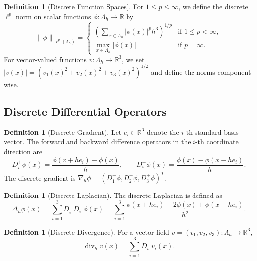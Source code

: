 \documentclass[12pt, a4paper]{article}
\theoremstyle{plain}
\theoremstyle{definition}
\newtheorem{definition}[theorem]{Definition}
\theoremstyle{remark}
\newcommand{\R}{\mathbb{R}}
\newcommand{\norm}[1]{\left\| #1 \right\|}
\newcommand{\grad}{\nabla_h}
\newcommand{\lapl}{\Delta_h}
\newcommand{\divh}{\operatorname{div}_h}
\begin{document}
\begin{definition}[Discrete Function Spaces]\label{def:spaces}
  For $1 \leq p \leq \infty$, we define the discrete $\ell^p$ norm on
  scalar functions $\phi: \Lambda_h \to \R$ by
  \begin{equation}
    \norm{\phi}_{\ell^p(\Lambda_h)} =
    \begin{cases}
      \displaystyle\left( \sum_{x \in \Lambda_h} |\phi(x)|^p h^3 \right)^{1/p} & \text{if } 1 \leq p < \infty, \\[10pt]
      \displaystyle\max_{x \in \Lambda_h} |\phi(x)| & \text{if } p = \infty.
    \end{cases}
  \end{equation}
  For vector-valued functions $v: \Lambda_h \to \R^3$, we set
  $|v(x)| = (v_1(x)^2 + v_2(x)^2 + v_3(x)^2)^{1/2}$ and define the norms
  component-wise.
\end{definition}

\subsection{Discrete Differential Operators}

\begin{definition}[Discrete Gradient]\label{def:grad}
  Let $e_i \in \R^3$ denote the $i$-th standard basis vector. The forward and
  backward difference operators in the $i$-th coordinate direction are
  \begin{equation}
    D_i^+ \phi(x) = \frac{\phi(x + he_i) - \phi(x)}{h}, \qquad
    D_i^- \phi(x) = \frac{\phi(x) - \phi(x - he_i)}{h}.
  \end{equation}
  The discrete gradient is $\grad \phi = (D_1^+ \phi, D_2^+ \phi, D_3^+ \phi)^T$.
\end{definition}

\begin{definition}[Discrete Laplacian]\label{def:lapl}
  The discrete Laplacian is defined as
  \begin{equation}
    \lapl \phi(x) = \sum_{i=1}^{3} D_i^+ D_i^- \phi(x)
    = \sum_{i=1}^{3} \frac{\phi(x+he_i) - 2\phi(x) + \phi(x-he_i)}{h^2}.
  \end{equation}
\end{definition}

\begin{definition}[Discrete Divergence]\label{def:div}
  For a vector field $v = (v_1, v_2, v_3): \Lambda_h \to \R^3$,
  \begin{equation}
    \divh v(x) = \sum_{i=1}^{3} D_i^- v_i(x).
  \end{equation}
\end{definition}
\end{document}
